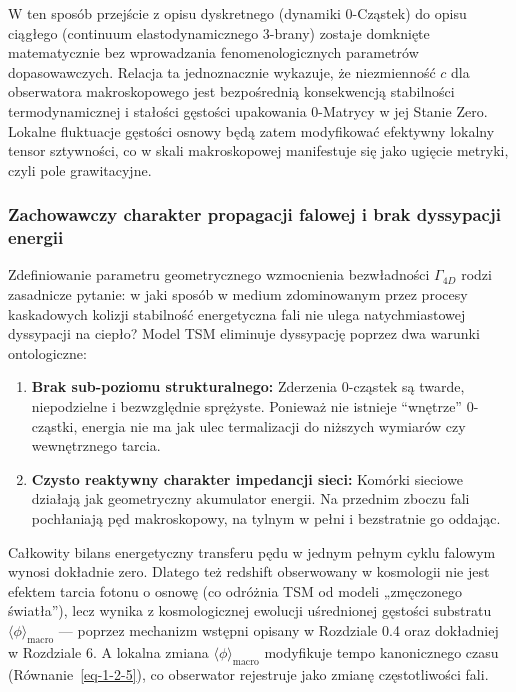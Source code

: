 \documentclass[
  polish,
  letterpaper,
  DIV=11,
  numbers=noendperiod,
  oneside]{scrartcl}
\providecommand{\tightlist}{%
  \setlength{\itemsep}{0pt}\setlength{\parskip}{0pt}}
\begin{document}
W ten sposób przejście z opisu dyskretnego (dynamiki 0-Cząstek) do opisu
ciągłego (continuum elastodynamicznego 3-brany) zostaje domknięte
matematycznie bez wprowadzania fenomenologicznych parametrów
dopasowawczych. Relacja ta jednoznacznie wykazuje, że niezmienność \(c\)
dla obserwatora makroskopowego jest bezpośrednią konsekwencją
stabilności termodynamicznej i stałości gęstości upakowania 0-Matrycy w
jej Stanie Zero. Lokalne fluktuacje gęstości osnowy będą zatem
modyfikować efektywny lokalny tensor sztywności, co w skali
makroskopowej manifestuje się jako ugięcie metryki, czyli pole
grawitacyjne.

\subsubsection{Zachowawczy charakter propagacji falowej i brak
dyssypacji energii}\label{sec-1-3-5}

Zdefiniowanie parametru geometrycznego wzmocnienia bezwładności
\(\Gamma_{4D}\) rodzi zasadnicze pytanie: w jaki sposób w medium
zdominowanym przez procesy kaskadowych kolizji stabilność energetyczna
fali nie ulega natychmiastowej dyssypacji na ciepło? Model TSM eliminuje
dyssypację poprzez dwa warunki ontologiczne:

\begin{enumerate}
\def\labelenumi{\arabic{enumi}.}
\tightlist
\item
  \textbf{Brak sub-poziomu strukturalnego:} Zderzenia 0-cząstek są
  twarde, niepodzielne i bezwzględnie sprężyste. Ponieważ nie istnieje
  ``wnętrze'' 0-cząstki, energia nie ma jak ulec termalizacji do
  niższych wymiarów czy wewnętrznego tarcia.
\item
  \textbf{Czysto reaktywny charakter impedancji sieci:} Komórki sieciowe
  działają jak geometryczny akumulator energii. Na przednim zboczu fali
  pochłaniają pęd makroskopowy, na tylnym w pełni i bezstratnie go
  oddając.
\end{enumerate}

Całkowity bilans energetyczny transferu pędu w jednym pełnym cyklu
falowym wynosi dokładnie zero. Dlatego też redshift obserwowany w
kosmologii nie jest efektem tarcia fotonu o osnowę (co odróżnia TSM od
modeli „zmęczonego światła''), lecz wynika z kosmologicznej ewolucji
uśrednionej gęstości substratu \(\langle\phi\rangle_\text{macro}\) ---
poprzez mechanizm wstępni opisany w Rozdziale 0.4 oraz dokładniej w
Rozdziale 6. A lokalna zmiana \(\langle\phi\rangle_\text{macro}\)
modyfikuje tempo kanonicznego czasu (Równanie~\ref{eq-1-2-5}), co
obserwator rejestruje jako zmianę częstotliwości fali.
\end{document}
